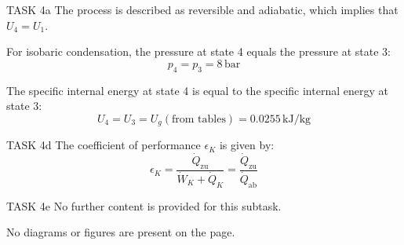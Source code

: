 TASK 4a  
The process is described as reversible and adiabatic, which implies that \( U_4 = U_1 \).  

For isobaric condensation, the pressure at state 4 equals the pressure at state 3:  
\[
p_4 = p_3 = 8 \, \text{bar}
\]  

The specific internal energy at state 4 is equal to the specific internal energy at state 3:  
\[
U_4 = U_3 = U_g (\text{from tables}) = 0.0255 \, \text{kJ/kg}
\]  

TASK 4d  
The coefficient of performance \( \epsilon_K \) is given by:  
\[
\epsilon_K = \frac{\dot{Q}_{\text{zu}}}{\dot{W}_K + \dot{Q}_K} = \frac{\dot{Q}_{\text{zu}}}{\dot{Q}_{\text{ab}}}
\]  

TASK 4e  
No further content is provided for this subtask.  

No diagrams or figures are present on the page.